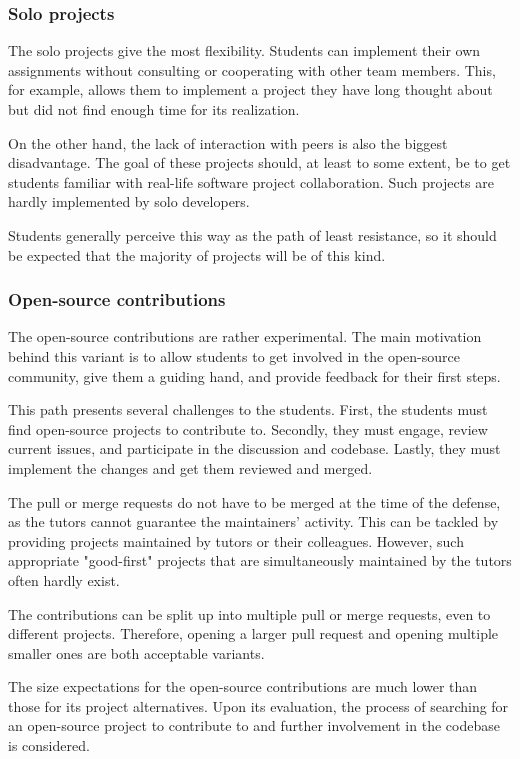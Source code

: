 \documentclass[
  digital,
  color,
  oneside,
  nosansbold,
  nocolorbold,
  lof,
  lot,
]{fithesis4}
\begin{document}
\subsubsection{Solo projects}

The solo projects give the most flexibility. Students can implement their own assignments without consulting or cooperating with other team members. This, for example, allows them to implement a project they have long thought about but did not find enough time for its realization.

On the other hand, the lack of interaction with peers is also the biggest disadvantage. The goal of these projects should, at least to some extent, be to get students familiar with real-life software project collaboration. Such projects are hardly implemented by solo developers.

Students generally perceive this way as the path of least resistance, so it should be expected that the majority of projects will be of this kind.

\subsubsection{Open-source contributions}

The open-source contributions are rather experimental. The main motivation behind this variant is to allow students to get involved in the open-source community, give them a guiding hand, and provide feedback for their first steps. 

This path presents several challenges to the students. First, the students must find open-source projects to contribute to. Secondly, they must engage, review current issues, and participate in the discussion and codebase. Lastly, they must implement the changes and get them reviewed and merged.

The pull or merge requests do not have to be merged at the time of the defense, as the tutors cannot guarantee the maintainers' activity. This can be tackled by providing projects maintained by tutors or their colleagues. However, such appropriate "good-first" projects that are simultaneously maintained by the tutors often hardly exist.

The contributions can be split up into multiple pull or merge requests, even to different projects. Therefore, opening a larger pull request and opening multiple smaller ones are both acceptable variants.

The size expectations for the open-source contributions are much lower than those for its project alternatives. Upon its evaluation, the process of searching for an open-source project to contribute to and further involvement in the codebase is considered.
\end{document}
